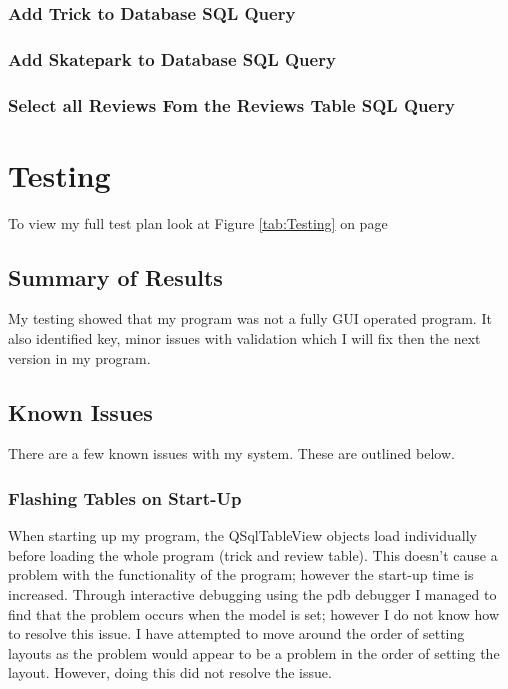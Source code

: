 \subsubsection{Add Trick to Database SQL Query}



\subsubsection{Add Skatepark to Database SQL Query}



\subsubsection{Select all Reviews Fom the Reviews Table SQL Query}



\section {Testing}

To view my full test plan look at Figure \ref{tab:Testing} on page \pageref{tab:Testing}

\subsection{Summary of Results}

My testing showed that my program was not a fully GUI operated program. It also identified key, minor issues with validation which I will fix then the next version in my program.

\subsection{Known Issues}

There are a few known issues with my system. These are outlined below.

\subsubsection{Flashing Tables on Start-Up}

When starting up my program, the QSqlTableView objects load individually before loading the whole program (trick and review table). This doesn't cause a problem with the functionality of the program; however the start-up time is increased. Through interactive debugging using the pdb debugger I managed to find that the problem occurs when the model is set; however I do not know how to resolve this issue. I have attempted to move around the order of setting layouts as the problem would appear to be a problem in the order of setting the layout. However, doing this did not resolve the issue.

